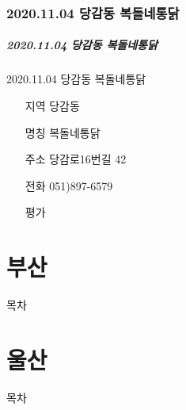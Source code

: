 \documentclass[aspectratio=1610,17pt,xcolor=pdftex,dvipsnames,table,handout]{beamer}
\begin{document}
		\section{ 2020.11.04 당감동 복돌네통닭}
		\begin{frame} [t,plain]
		\frametitle{ 2020.11.04 당감동 복돌네통닭}
			\begin{block} { 2020.11.04 당감동 복돌네통닭}
			\setlength{\leftmargini}{4em}			
			\begin{itemize}
				\item [지역] 당감동
				\item [명칭] 복돌네통닭
				\item [주소] 당감로16번길 42
				\item [전화] 051)897-6579
				\item [평가] 
			\end{itemize}
			\end{block}						
		\end{frame}						

		\begin{frame} [t,plain]
		\end{frame}						
		\begin{frame} [t,plain]
		\end{frame}						


		\part{ 부산 }
		\frame{\partpage}

\label{part3} 	%

		\begin{frame} [plain]{목차}
		\tableofcontents%
		\end{frame}



		\part{ 울산 }
		\frame{\partpage}
		
\label{part4} 	%

		\begin{frame} [plain]{목차}
		\tableofcontents%
		\end{frame}
\end{document}
